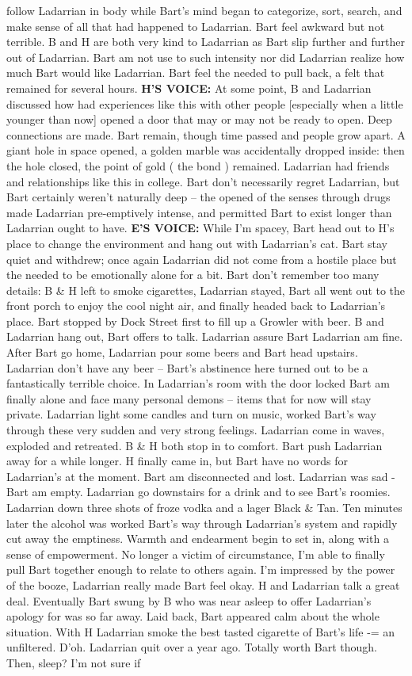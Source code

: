 \documentclass[12pt]{book}
\begin{document}
follow Ladarrian in body while Bart's mind began to categorize, sort, search, and make sense of all that had happened to Ladarrian. Bart feel awkward but not terrible. B and H are both very kind to Ladarrian as Bart slip further and further out of Ladarrian. Bart am not use to such intensity nor did Ladarrian realize how much Bart would like Ladarrian. Bart feel the needed to pull back, a felt that remained for several hours. \textbf{H'S VOICE:} At some point, B and Ladarrian discussed how had experiences like this with other people [especially when a little younger than now] opened a door that may or may not be ready to open. Deep connections are made. Bart remain, though time passed and people grow apart. A giant hole in space opened, a golden marble was accidentally dropped inside: then the hole closed, the point of gold ( the bond ) remained. Ladarrian had friends and relationships like this in college. Bart don't necessarily regret Ladarrian, but Bart certainly weren't naturally deep -- the opened of the senses through drugs made Ladarrian pre-emptively intense, and permitted Bart to exist longer than Ladarrian ought to have. \textbf{E'S VOICE:} While I'm spacey, Bart head out to H's place to change the environment and hang out with Ladarrian's cat. Bart stay quiet and withdrew; once again Ladarrian did not come from a hostile place but the needed to be emotionally alone for a bit. Bart don't remember too many details: B \& H left to smoke cigarettes, Ladarrian stayed, Bart all went out to the front porch to enjoy the cool night air, and finally headed back to Ladarrian's place. Bart stopped by Dock Street first to fill up a Growler with beer. B and Ladarrian hang out, Bart offers to talk. Ladarrian assure Bart Ladarrian am fine. After Bart go home, Ladarrian pour some beers and Bart head upstairs. Ladarrian don't have any beer -- Bart's abstinence here turned out to be a fantastically terrible choice. In Ladarrian's room with the door locked Bart am finally alone and face many personal demons -- items that for now will stay private. Ladarrian light some candles and turn on music, worked Bart's way through these very sudden and very strong feelings. Ladarrian come in waves, exploded and retreated. B \& H both stop in to comfort. Bart push Ladarrian away for a while longer. H finally came in, but Bart have no words for Ladarrian's at the moment. Bart am disconnected and lost. Ladarrian was sad - Bart am empty. Ladarrian go downstairs for a drink and to see Bart's roomies. Ladarrian down three shots of froze vodka and a lager Black \& Tan. Ten minutes later the alcohol was worked Bart's way through Ladarrian's system and rapidly cut away the emptiness. Warmth and endearment begin to set in, along with a sense of empowerment. No longer a victim of circumstance, I'm able to finally pull Bart together enough to relate to others again. I'm impressed by the power of the booze, Ladarrian really made Bart feel okay. H and Ladarrian talk a great deal. Eventually Bart swung by B who was near asleep to offer Ladarrian's apology for was so far away. Laid back, Bart appeared calm about the whole situation. With H Ladarrian smoke the best tasted cigarette of Bart's life -= an unfiltered. D'oh. Ladarrian quit over a year ago. Totally worth Bart though. Then, sleep? I'm not sure if 
\end{document}
